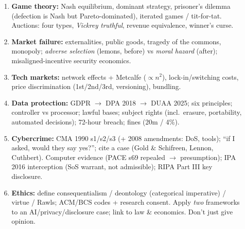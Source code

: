 \documentclass[11pt,a4paper]{article}
\begin{document}
\begin{must}
\begin{enumerate}[leftmargin=*,itemsep=2pt]
  \item \textbf{Game theory:} Nash equilibrium, dominant strategy, prisoner's dilemma (defection is Nash but Pareto-dominated), iterated games / tit-for-tat. Auctions: four types, \emph{Vickrey truthful}, revenue equivalence, winner's curse.
  \item \textbf{Market failure:} externalities, public goods, tragedy of the commons, monopoly; \emph{adverse selection} (lemons, before) vs \emph{moral hazard} (after); misaligned-incentive security economics.
  \item \textbf{Tech markets:} network effects + Metcalfe ($\propto n^2$), lock-in/switching costs, price discrimination (1st/2nd/3rd, versioning), bundling.
  \item \textbf{Data protection:} GDPR $\to$ DPA 2018 $\to$ DUAA 2025; six principles; controller vs processor; lawful bases; subject rights (incl.\ erasure, portability, automated decisions); 72-hour breach; fines (\texteuro20m / 4\%).
  \item \textbf{Cybercrime:} CMA 1990 s1/s2/s3 (+ 2008 amendments: DoS, tools); ``if I asked, would they say yes?''; cite a case (Gold \& Schifreen, Lennon, Cuthbert). Computer evidence (PACE s69 repealed $\to$ presumption); IPA 2016 interception (SoS warrant, not admissible); RIPA Part III key disclosure.
  \item \textbf{Ethics:} define consequentialism / deontology (categorical imperative) / virtue / Rawls; ACM/BCS codes + research consent. Apply \emph{two} frameworks to an AI/privacy/disclosure case; link to law \& economics. Don't just give opinion.
\end{enumerate}
\end{must}
\end{document}
